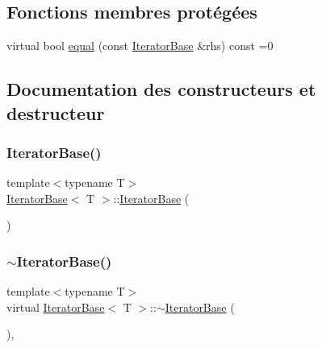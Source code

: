 \subsection*{Fonctions membres protégées}
\begin{DoxyCompactItemize}
\item 
virtual bool \hyperlink{class_iterator_base_a08430515a17384d098eb62ecce1b64c6}{equal} (const \hyperlink{class_iterator_base}{Iterator\+Base} \&rhs) const =0
\end{DoxyCompactItemize}


\subsection{Documentation des constructeurs et destructeur}
\mbox{\label{class_iterator_base_a6d1810e7a0a84574bb61d78bb99d96bb}} 
\subsubsection{\texorpdfstring{Iterator\+Base()}{IteratorBase()}}
{\footnotesize\ttfamily template$<$typename T$>$ \\
\hyperlink{class_iterator_base}{Iterator\+Base}$<$ T $>$\+::\hyperlink{class_iterator_base}{Iterator\+Base} (\begin{DoxyParamCaption}{ }\end{DoxyParamCaption})\hspace{0.3cm}{\ttfamily [default]}}

\mbox{\label{class_iterator_base_a9b0e1d44c1fb3e68171746b045676526}} 
\subsubsection{\texorpdfstring{$\sim$\+Iterator\+Base()}{~IteratorBase()}}
{\footnotesize\ttfamily template$<$typename T$>$ \\
virtual \hyperlink{class_iterator_base}{Iterator\+Base}$<$ T $>$\+::$\sim$\hyperlink{class_iterator_base}{Iterator\+Base} (\begin{DoxyParamCaption}{ }\end{DoxyParamCaption})\hspace{0.3cm}{\ttfamily [virtual]}, {\ttfamily [default]}}



